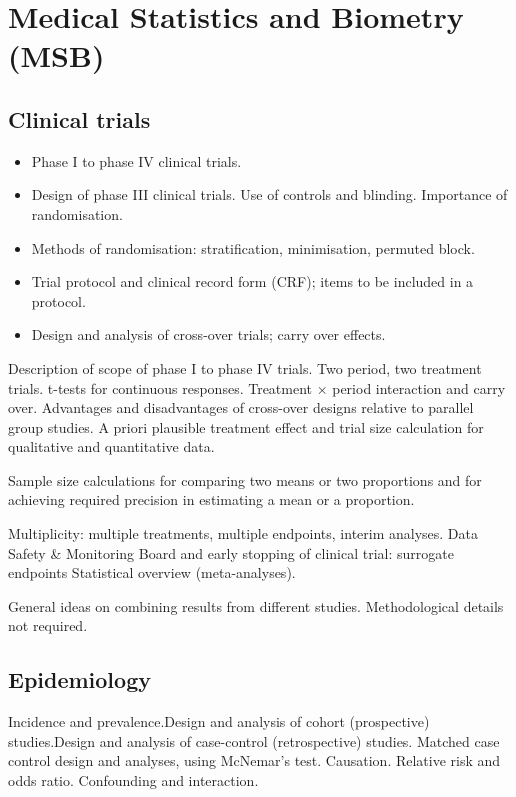 \section*{Medical Statistics and Biometry (MSB)}
\subsection*{Clinical trials}

\begin{itemize}
\item Phase I to phase IV clinical trials.
\item Design of phase III clinical trials. Use of controls and blinding. Importance of randomisation.
\item Methods of randomisation: stratification, minimisation, permuted block.
\item Trial protocol and clinical record form (CRF); items to be included in a protocol.
\item Design and analysis of cross-over trials; carry over effects.
\end{itemize}
 
Description of scope of phase I to phase IV trials.
Two period, two treatment trials. t-tests for continuous responses. Treatment × period interaction
and carry over. Advantages and disadvantages of cross-over designs relative to
parallel group studies.
A priori plausible treatment effect and trial size
calculation for qualitative and quantitative data.
 
Sample size calculations for comparing two means or two proportions and for achieving
required precision in estimating a mean or a proportion.
 
Multiplicity: multiple treatments, multiple endpoints, interim analyses.
Data Safety & Monitoring Board and early stopping of clinical trial: surrogate endpoints
Statistical overview (meta-analyses).
 
General ideas on combining results from different studies. Methodological details not required.
 
\subsection*{Epidemiology}
Incidence and prevalence.Design and analysis of cohort (prospective) studies.Design and analysis of case-control (retrospective) studies. Matched case control design and analyses, using McNemar's test.
Causation.
Relative risk and odds ratio.
Confounding and interaction.
